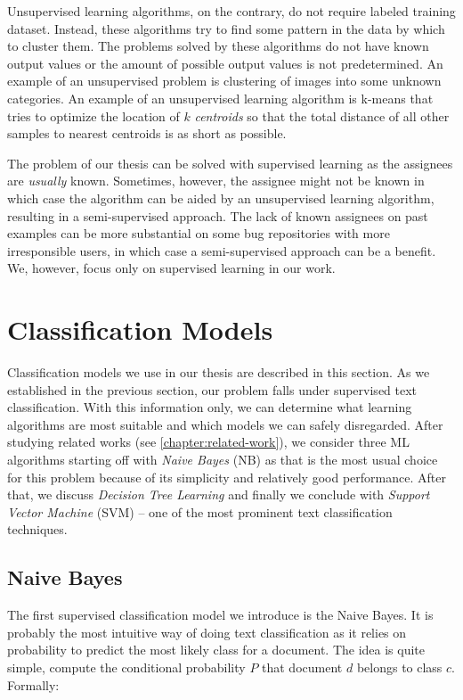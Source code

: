Unsupervised learning algorithms, on the contrary, do not require labeled training dataset. Instead, these algorithms try to find some pattern in the data by which to cluster them. The problems solved by these algorithms do not have known output values or the amount of possible output values is not predetermined. An example of an unsupervised problem is clustering of images into some unknown categories. An example of an unsupervised learning algorithm is k-means that tries to optimize the location of $k$ \textit{centroids} so that the total distance of all other samples to nearest centroids is as short as possible.

The problem of our thesis can be solved with supervised learning as the assignees are \textit{usually} known. Sometimes, however, the assignee might not be known in which case the algorithm can be aided by an unsupervised learning algorithm, resulting in a semi-supervised approach. The lack of known assignees on past examples can be more substantial on some bug repositories with more irresponsible users, in which case a semi-supervised approach can be a benefit. We, however, focus only on supervised learning in our work.

\section{Classification Models}

Classification models we use in our thesis are described in this section. As we established in the previous section, our problem falls under supervised text classification. With this information only, we can determine what learning algorithms are most suitable and which models we can safely disregarded. After studying related works (see \autoref{chapter:related-work}), we consider three ML algorithms starting off with \textit{Naive Bayes} (NB) as that is the most usual choice for this problem because of its simplicity and relatively good performance. After that, we discuss \textit{Decision Tree Learning} and finally we conclude with \textit{Support Vector Machine} (SVM) -- one of the most prominent text classification techniques.

\subsection{Naive Bayes}

The first supervised classification model we introduce is the Naive Bayes. It is probably the most intuitive way of doing text classification as it relies on probability to predict the most likely class for a document. The idea is quite simple, compute the conditional probability $P$ that document $d$ belongs to class $c$. Formally:

